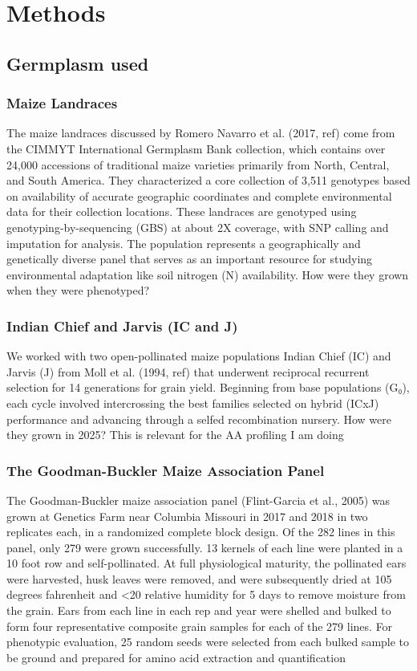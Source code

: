 \documentclass[pdflatex,sn-mathphys-num]{sn-jnl}%
\theoremstyle{thmstyleone}%
\theoremstyle{thmstyletwo}%
\theoremstyle{thmstylethree}%
\begin{document}
\section{Methods}\label{methods}

\subsection{Germplasm used}
\subsubsection{Maize Landraces}
The maize landraces discussed by Romero Navarro et al. (2017, ref) come from the CIMMYT International Germplasm Bank collection, which contains over 24,000 accessions of traditional maize varieties primarily from North, Central, and South America. They characterized a core collection of 3,511 genotypes based on availability of accurate geographic coordinates and complete environmental data for their collection locations. These landraces are genotyped using genotyping-by-sequencing (GBS) at about 2X coverage, with SNP calling and imputation for analysis. The population represents a geographically and genetically diverse panel that serves as an important resource for studying environmental adaptation like soil nitrogen (N) availability.
How were they grown when they were phenotyped?

\subsubsection{Indian Chief and Jarvis (IC and J)  }
We worked with two open-pollinated maize populations Indian Chief (IC) and Jarvis (J) from Moll et al. (1994, ref) that underwent reciprocal recurrent selection for 14 generations for grain yield. Beginning from base populations (G₀), each cycle involved intercrossing the best families selected on hybrid (ICxJ) performance and advancing through a selfed recombination nursery. 
How were they grown in 2025? This is relevant for the AA profiling I am doing 

\subsubsection{The Goodman-Buckler Maize Association Panel}
The Goodman-Buckler maize association panel (Flint-Garcia et al., 2005)  was grown at Genetics Farm near Columbia Missouri in 2017 and 2018 in two replicates each, in a randomized complete block design. Of the 282 lines in this panel, only 279 were grown successfully. 13 kernels of each line were planted in a 10 foot row and self-pollinated. At full physiological maturity, the pollinated ears were harvested, husk leaves were removed, and were subsequently dried at 105 degrees fahrenheit and <20 relative humidity for 5 days to remove moisture from the grain. Ears from each line in each rep and year were shelled and bulked to form four representative composite grain samples for each of the 279 lines. For phenotypic evaluation, 25 random seeds were selected from each bulked sample to be ground and prepared for amino acid extraction and quantification
\end{document}
